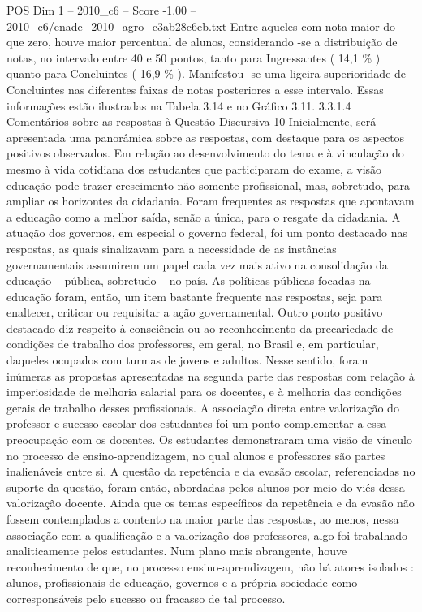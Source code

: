 \begin{textsample}{POS Dim 1 – 2010\_c6 – Score -1.00 – 2010\_c6/enade\_2010\_agro\_c3ab28c6eb.txt}
Entre aqueles com nota maior do que zero, houve maior percentual de alunos, considerando -se a distribuição de notas, no intervalo entre 40 e 50 pontos, tanto para Ingressantes ( 14,1 \% ) quanto para Concluintes ( 16,9 \% ).
Manifestou -se uma ligeira superioridade de Concluintes nas diferentes faixas de notas posteriores a esse intervalo.
Essas informações estão ilustradas na Tabela 3.14 e no Gráfico 3.11. 3.3.1.4 Comentários sobre as respostas à Questão Discursiva 10 Inicialmente, será apresentada uma panorâmica sobre as respostas, com destaque para os aspectos positivos observados.
Em relação ao desenvolvimento do tema e à vinculação do mesmo à vida cotidiana dos estudantes que participaram do exame, a visão educação pode trazer crescimento não somente profissional, mas, sobretudo, para ampliar os horizontes da cidadania.
Foram frequentes as respostas que apontavam a educação como a melhor saída, senão a única, para o resgate da cidadania.
A atuação dos governos, em especial o governo federal, foi um ponto destacado nas respostas, as quais sinalizavam para a necessidade de as instâncias governamentais assumirem um papel cada vez mais ativo na consolidação da educação – pública, sobretudo – no país.
As políticas públicas focadas na educação foram, então, um item bastante frequente nas respostas, seja para enaltecer, criticar ou requisitar a ação governamental.
Outro ponto positivo destacado diz respeito à consciência ou ao reconhecimento da precariedade de condições de trabalho dos professores, em geral, no Brasil e, em particular, daqueles ocupados com turmas de jovens e adultos.
Nesse sentido, foram inúmeras as propostas apresentadas na segunda parte das respostas com relação à imperiosidade de melhoria salarial para os docentes, e à melhoria das condições gerais de trabalho desses profissionais.
A associação direta entre valorização do professor e sucesso escolar dos estudantes foi um ponto complementar a essa preocupação com os docentes.
Os estudantes demonstraram uma visão de vínculo no processo de ensino-aprendizagem, no qual alunos e professores são partes inalienáveis entre si.
A questão da repetência e da evasão escolar, referenciadas no suporte da questão, foram então, abordadas pelos alunos por meio do viés dessa valorização docente.
Ainda que os temas específicos da repetência e da evasão não fossem contemplados a contento na maior parte das respostas, ao menos, nessa associação com a qualificação e a valorização dos professores, algo foi trabalhado analiticamente pelos estudantes.
Num plano mais abrangente, houve reconhecimento de que, no processo ensino-aprendizagem, não há atores isolados : alunos, profissionais de educação, governos e a própria sociedade como corresponsáveis pelo sucesso ou fracasso de tal processo.

\end{textsample}
